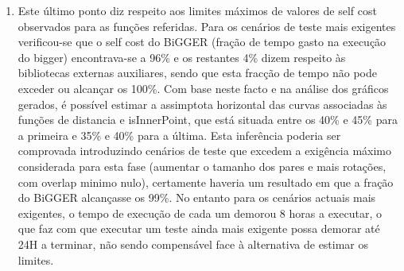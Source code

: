 \begin{enumerate}
	\item{Este último ponto diz respeito aos limites máximos de valores de self cost observados para as funções referidas. Para os cenários de teste mais exigentes verificou-se que o self cost do BiGGER (fração de tempo gasto na execução do bigger) encontrava-se a 96\% e os restantes 4\% dizem respeito às bibliotecas externas auxiliares, sendo que esta fracção de tempo não pode exceder ou alcançar os 100\%. Com base neste facto e na análise dos gráficos gerados, é possível estimar a assimptota horizontal das curvas associadas às funções de distancia e isInnerPoint, que está situada entre os 40\% e 45\% para a primeira e 35\% e 40\% para a última. Esta inferência poderia ser comprovada introduzindo cenários de teste que excedem a exigência máximo considerada para esta fase (aumentar o tamanho dos pares e mais rotações, com overlap minimo nulo), certamente haveria um resultado em que a fração do BiGGER alcançasse os 99\%. No entanto para os cenários actuais mais exigentes, o tempo de execução de cada um demorou 8 horas a executar, o que faz com que executar um teste ainda mais exigente possa demorar até 24H a terminar, não sendo compensável face à alternativa de estimar os limites.  }
\end{enumerate}
% 


%
%
%





